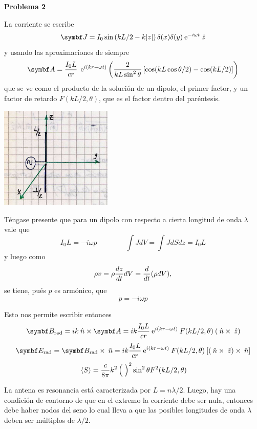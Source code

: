 \documentclass[10pt,oneside]{CBFT_book}
\begin{document}
\begin{ejemplo}{\bf Problema 2}

La corriente se escribe
\[
	\vb J = I_0 \sin\left( kL /2 - k|z| \right)\delta(x) \delta(y)\euler^{-i \omega t} \zver
\]
y usando las aproximaciones de siempre
\[
	\vb{A} = \frac{ I_0 L }{ c r } \: \euler^{i(kr-\omega t)} 
	\left( \frac{ 2 }{ k L\sin^2\theta } \left[ \cos(kL\cos\theta/2) - \cos(kL/2) \right] \right)
\]
que se ve como el producto de la solución de un dipolo, el primer factor, y un factor de retardo
$F(kL/2,\theta)$, que es el factor dentro del paréntesis.

\includegraphics[width=0.4\textwidth]{images/fig_ft1_antena_prob2.jpg}

Téngase presente que para un dipolo con respecto a cierta longitud de onda $\lambda$ vale que
\[
	I_0L = - i \omega p \qquad \qquad \int JdV = \int J dS dz = I_0 L
\]
y luego como 
\[
	\rho v = \rho \frac{d^{\hspace{-0.05em}} {z}}{d {t}^{\hspace{-0.05em}}}dV = \frac{d^{\hspace{-0.05em}} {}}{d {t}^{\hspace{-0.05em}}}(\rho dV), 
\]
se tiene, pués $p$ es armónico, que
\[
	\dot{p} = - i \omega p
\]

Esto nos permite escribir entonces
\[
	\vb B_{\text{rad}} = i k \nver \times \vb A =
	i k \frac{I_0L}{cr} \euler^{i(kr-\omega t)} \: F(kL/2,\theta) \: (\nver\times\zver)
\]
\[
	\vb E_{\text{rad}} = \vb B_{\text{rad}} \times \nver =
	i k \frac{I_0L}{cr} \euler^{i(kr-\omega t)} \: F(kL/2,\theta) \: [(\nver\times\zver)\times \nver]
\]
\[
	\:\left\langle S \right\rangle = \frac{c}{8\pi} k^2 \left( \frac{  }{  } \right)^2 \sin^2\theta F^2(kL/2,\theta)
\]

La antena es resonancia está caracterizada por $L = n\lambda/2$.
Luego, hay una condición de contorno de que en el extremo la corriente debe ser nula,
entonces debe haber nodos del seno lo cual lleva a que las posibles longitudes de
onda $\lambda$ deben ser múltiplos de $\lambda/2$.



\end{ejemplo}



\end{document}
